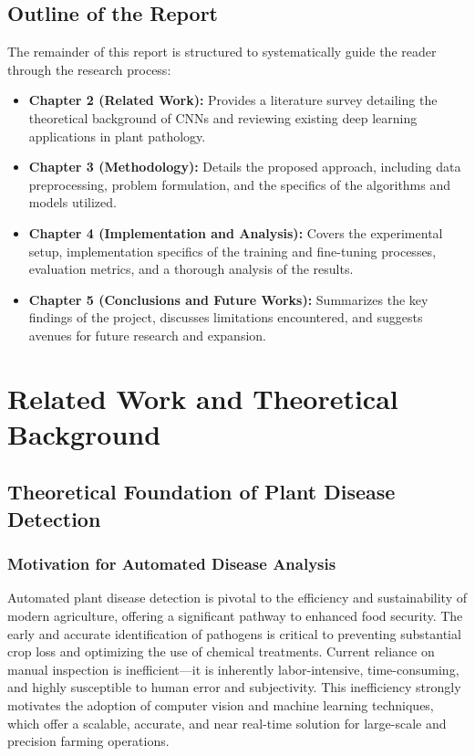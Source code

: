 \documentclass[12pt, a4paper]{report}
\begin{document}
\section{Outline of the Report}
\label{sec:outline}
The remainder of this report is structured to systematically guide the reader through the research process:
\begin{itemize}
    \item \textbf{Chapter 2 (Related Work):} Provides a literature survey detailing the theoretical background of CNNs and reviewing existing deep learning applications in plant pathology.
    \item \textbf{Chapter 3 (Methodology):} Details the proposed approach, including data preprocessing, problem formulation, and the specifics of the algorithms and models utilized.
    \item \textbf{Chapter 4 (Implementation and Analysis):} Covers the experimental setup, implementation specifics of the training and fine-tuning processes, evaluation metrics, and a thorough analysis of the results.
    \item \textbf{Chapter 5 (Conclusions and Future Works):} Summarizes the key findings of the project, discusses limitations encountered, and suggests avenues for future research and expansion.
\end{itemize}
\newpage
\chapter{Related Work and Theoretical Background}
\label{chap:related_work}

\section{Theoretical Foundation of Plant Disease Detection}
\label{sec:theoretical_background}

\subsection{Motivation for Automated Disease Analysis}
\label{subsec:motivation}
Automated plant disease detection is pivotal to the efficiency and sustainability of modern agriculture, offering a significant pathway to enhanced food security. The early and accurate identification of pathogens is critical to preventing substantial crop loss and optimizing the use of chemical treatments. Current reliance on manual inspection is inefficient—it is inherently labor-intensive, time-consuming, and highly susceptible to human error and subjectivity. This inefficiency strongly motivates the adoption of computer vision and machine learning techniques, which offer a scalable, accurate, and near real-time solution for large-scale and precision farming operations.
\end{document}
